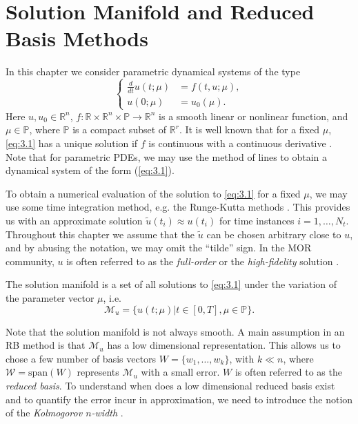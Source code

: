 \section{Solution Manifold and Reduced Basis Methods} \label{sec:3.1}
In this chapter we consider parametric dynamical systems of the type
\begin{equation} \label{eq:3.1}
\left\{
\begin{aligned}
	\frac d{dt} u(t;\mu) &= f(t,u;\mu),\\
	u(0;\mu) &= u_0(\mu).
\end{aligned}
\right.
\end{equation}
Here $u,u_0\in \mathbb R^{n}$, $f:\mathbb R \times \mathbb R^{n} \times \mathbb P\to \mathbb R^{n}$ is a smooth linear or nonlinear function, and $\mu \in \mathbb P$, where $\mathbb P$ is a compact subset of $\mathbb R^r$. It is well known that for a fixed $\mu$, \cref{eq:3.1} has a unique solution if $f$ is continuous with a continuous derivative \cite{rudin1976principles}. Note that for parametric PDEs, we may use the method of lines \cite{edsberg2015introduction} to obtain a dynamical system of the form (\ref{eq:3.1}).

To obtain a numerical evaluation of the solution to \cref{eq:3.1} for a fixed $\mu$, we may use some time integration method, e.g. the Runge-Kutta methods \cite{edsberg2015introduction}. This provides us with an approximate solution $\tilde u(t_i) \approx u(t_i)$ for time instances $i = 1 , \dots , N_t$. Throughout this chapter we assume that the $\tilde u$ can be chosen arbitrary close to $u$, and by abusing the notation, we may omit the ``tilde'' sign. In the MOR community, $u$ is often referred to as the \emph{full-order} or the \emph{high-fidelity} solution \cite{hesthaven2015certified,quarteroni2015reduced}. 

\begin{definition}
The solution manifold is a set of all solutions to \cref{eq:3.1} under the variation of the parameter vector $\mu$, i.e.
\begin{equation} \label{eq:3.2}
	\mathcal M_{u} = \{ u(t;\mu) | t \in [0,T] , \mu \in \mathbb P \}.
\end{equation}
\end{definition}
Note that the solution manifold is not always smooth. A main assumption in an RB method is that $\mathcal M_{u}$ has a low dimensional representation. This allows us to chose a few number of basis vectors $W = \{ w_1,\dots,w_k\}$, with $k\ll n$, where $\mathcal W = \text{span}(W)$ represents $\mathcal M_{u}$ with a small error. $W$ is often referred to as the \emph{reduced basis}. To understand when does a low dimensional reduced basis exist and to quantify the error incur in approximation, we need to introduce the notion of the \emph{Kolmogorov $n$-width} \cite{Kolmogoroff:1936fj,pinkus1985n}.

